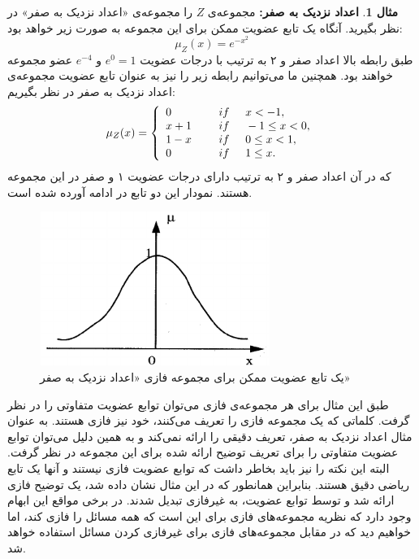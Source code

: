 \documentclass[12pt,a4paper]{article}
\theoremstyle{definition}
\newtheorem{exmp}{مثال}[section]
\begin{document}
\begin{exmp}\label{ex:e_2}
\textbf{اعداد نزدیک به صفر:}
مجموعه‌ی $Z$ را مجموعه‌ی «اعداد نزدیک به صفر» در نظر بگیرید. آنگاه یک تابع عضویت ممکن برای این مجموعه به صورت زیر خواهد بود:
$$ 	\mu_{Z}(x)=e^{-x^2} $$
	طبق رابطه بالا اعداد صفر و ۲ به ترتیب با درجات عضویت
$e^0=1$
	و
$e^{-4}$
	 عضو مجموعه خواهند بود. همچنین ما می‌توانیم رابطه زیر
	 را نیز به عنوان تابع عضویت مجموعه‌ی اعداد نزدیک به صفر در نظر بگیریم:
$$
	 	\mu_{Z}(x)=\left \{
	 \begin{array}{ll}
		0 \hskip 0.5cm & 	 if \hskip 0.5cm  x < -1,\\
		x+1 \hskip 0.5cm & 	if \hskip 0.5cm -1 \le x < 0,\\
		1-x \hskip 0.5cm & 	 if \hskip 0.5cm 0 \le x < 1,\\
		0 \hskip 0.5cm & 	 if \hskip 0.5cm 1 \le x.
	 \end{array}
	  \right.
$$
	که در آن اعداد صفر و ۲ به ترتیب دارای درجات عضویت ۱ و صفر در این مجموعه هستند. نمودار این  دو تابع در ادامه آورده شده است. 
	\begin{figure}[b]
		\centering 
		\includegraphics[width=75mm]{Images/Fig3.png}
		\vspace{-0.5cm}
		\caption{یک تابع عضویت ممکن برای مجموعه فازی «اعداد نزدیک به صفر»}\label{fig:f_3}
	\end{figure}
طبق این مثال برای هر مجموعه‌ی فازی می‌توان توابع عضویت متفاوتی را در نظر گرفت. کلماتی که یک مجموعه فازی را تعریف می‌کنند، خود نیز فازی هستند. به عنوان مثال اعداد نزدیک به صفر، تعریف دقیقی را ارائه نمی‌کند و به همین دلیل می‌توان توابع عضویت متفاوتی را برای تعریف توضیح ارائه شده برای این مجموعه در نظر گرفت. البته این نکته را نیز باید بخاطر داشت که توابع عضویت فازی نیستند و آنها یک تابع ریاضی دقیق هستند. 
 بنابراین همانطور که در این مثال نشان داده شد، یک توضیح فازی ارائه شد و توسط توابع عضویت، به غیرفازی  تبدیل شدند. در برخی مواقع این ابهام وجود دارد که نظریه مجموعه‌های فازی برای این است که همه مسائل را فازی کند، اما خواهیم دید که در مقابل مجموعه‌های فازی برای غیرفازی کردن مسائل استفاده خواهد شد.
\cite{Wang1997}	
\begin{figure}[h]

\end{figure}
\end{exmp}
\end{document}
